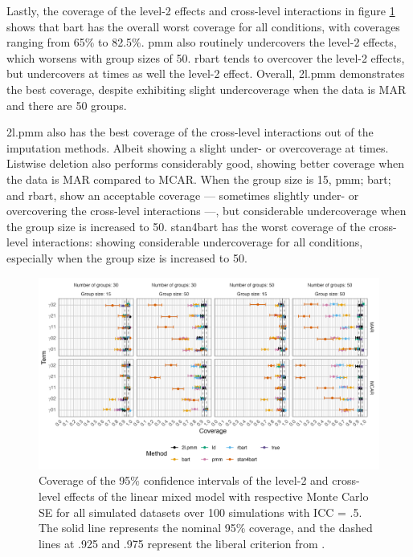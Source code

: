 \documentclass[10pt, a4paper, titlepage]{article}
\begin{document}
Lastly, the coverage of the level-2 effects and cross-level interactions in figure \ref{fig:coveragelevel2} shows that bart has the overall worst coverage for all conditions, with coverages ranging from 65\% to 82.5\%. pmm also routinely undercovers the level-2 effects, which worsens with group sizes of 50. rbart tends to overcover the level-2 effects, but undercovers at times as well the level-2 effect. Overall, 2l.pmm demonstrates the best coverage, despite exhibiting slight undercoverage when the data is MAR and there are 50 groups. 

2l.pmm also has the best coverage of the cross-level interactions out of the imputation methods. Albeit showing a slight under- or overcoverage at times. Listwise deletion also performs considerably good, showing better coverage when the data is MAR compared to MCAR. When the group size is 15, pmm; bart; and rbart, show an acceptable coverage --- sometimes slightly under- or overcovering the cross-level interactions ---, but considerable undercoverage when the group size is increased to 50. stan4bart has the worst coverage of the cross-level interactions: showing considerable undercoverage for all conditions, especially when the group size is increased to 50.


\begin{figure}[H]
    \centering
    \includegraphics[width=1\textwidth]{coveragelevel2.png}
    \caption{Coverage of the 95\% confidence intervals of the level-2 and cross-level effects of the linear mixed model with respective Monte Carlo SE for all simulated datasets over 100 simulations with ICC = .5. The solid line represents the nominal 95\% coverage, and the dashed lines at .925 and .975 represent the liberal criterion from \citet{bradley1978}.}
    \label{fig:coveragelevel2}
\end{figure}
\end{document}
